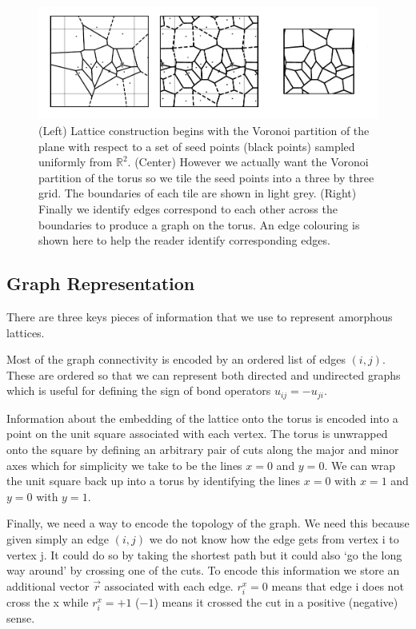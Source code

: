\begin{figure}
\hypertarget{fig:lattice_construction_animated}{%
\centering
\includegraphics[width=1\textwidth,height=\textheight]{figure_code/amk_chapter/lattice_construction_animated/lattice_construction_animated.pdf}
\caption{(Left) Lattice construction begins with the Voronoi partition of the plane with respect to a set of seed points (black points) sampled uniformly from \(\mathbb{R}^2\). (Center) However we actually want the Voronoi partition of the torus so we tile the seed points into a three by three grid. The boundaries of each tile are shown in light grey. (Right) Finally we identify edges correspond to each other across the boundaries to produce a graph on the torus. An edge colouring is shown here to help the reader identify corresponding edges.}\label{fig:lattice_construction_animated}
}
\end{figure}

\hypertarget{graph-representation}{%
\subsection{Graph Representation}\label{graph-representation}}

There are three keys pieces of information that we use to represent amorphous lattices.

Most of the graph connectivity is encoded by an ordered list of edges \((i,j)\). These are ordered so that we can represent both directed and undirected graphs which is useful for defining the sign of bond operators \(u_{ij} = - u_{ji}\).

Information about the embedding of the lattice onto the torus is encoded into a point on the unit square associated with each vertex. The torus is unwrapped onto the square by defining an arbitrary pair of cuts along the major and minor axes which for simplicity we take to be the lines \(x = 0\) and \(y = 0\). We can wrap the unit square back up into a torus by identifying the lines \(x = 0\) with \(x = 1\) and \(y = 0\) with \(y = 1\).

Finally, we need a way to encode the topology of the graph. We need this because given simply an edge \((i, j)\) we do not know how the edge gets from vertex i to vertex j. It could do so by taking the shortest path but it could also `go the long way around' by crossing one of the cuts. To encode this information we store an additional vector \(\vec{r}\) associated with each edge. \(r_i^x = 0\) means that edge i does not cross the x while \(r_i^x = +1\) (\(-1\)) means it crossed the cut in a positive (negative) sense.

